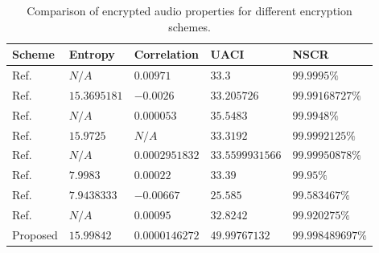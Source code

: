 \documentclass[a4paper]{cas-sc}
\begin{document}
\begin{table}[pos=H]
    \begin{center}
        \caption{Comparison of encrypted audio properties for different encryption schemes.}
        \begin{tabularx}{\textwidth}{>{\centering\arraybackslash}X>{\centering\arraybackslash}X>{\centering\arraybackslash}X>{\centering\arraybackslash}X>{\centering\arraybackslash}X}
            \toprule
            \textbf{Scheme}                 & \textbf{Entropy}    & \textbf{Correlation}    & \textbf{UACI}          & \textbf{NSCR}             \\
            \midrule
            Ref. \cite{farsana2023audio}    & $N/A$               & $0.00971$               & $33.3$                 & $99.9995\%$               \\
            Ref. \cite{shah2021efficient}   & $15.3695181$        & $-0.0026$               & $33.205726$            & $99.99168727\%$           \\
            Ref. \cite{abdelfatah2020audio} & $N/A$               & $0.000053$              & $35.5483$              & $99.9948\%$               \\
            Ref. \cite{lima2016audio}       & $15.9725$           & $N/A$                   & $33.3192$              & $99.9992125\%$            \\
            Ref. \cite{naskar2021audio}     & $N/A$               & $0.0002951832$          & $33.5599931566$        & $99.99950878\%$           \\
            Ref. \cite{adeel2020novel}      & $7.9983$            & $0.00022$               & $33.39$                & $99.95\%$                 \\
            Ref. \cite{aziz2021noise}       & $7.9438333$         & $-0.00667$              & $25.585$               & $99.583467\%$             \\
            Ref. \cite{dai2021audio}        & $N/A$               & $0.00095$               & $32.8242$              & $99.920275\%$             \\
            Proposed                        & $\mathbf{15.99842}$ & $\mathbf{0.0000146272}$ & $\mathbf{49.99767132}$ & $\mathbf{99.998489697\%}$ \\
            \bottomrule
        \end{tabularx}
        \label{table:analysis}
    \end{center}
\end{table}
\end{document}
